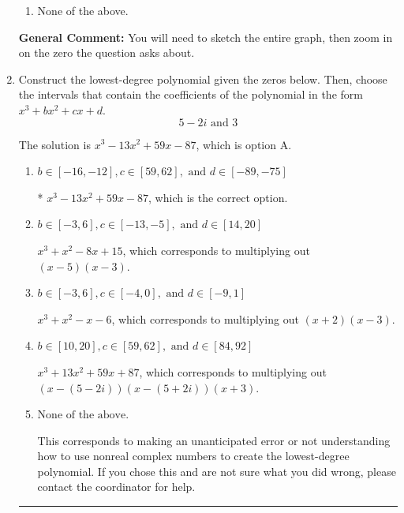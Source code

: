 \documentclass{extbook}[14pt]
\newcommand{\litem}[1]{\item #1

\rule{\textwidth}{0.4pt}}
\begin{document}
\begin{enumerate}
{\begin{enumerate}[label=\Alph*.]
\item None of the above.\end{enumerate}
\textbf{General Comment:} You will need to sketch the entire graph, then zoom in on the zero the question asks about.
}
\litem{
Construct the lowest-degree polynomial given the zeros below. Then, choose the intervals that contain the coefficients of the polynomial in the form $x^3+bx^2+cx+d$.
\[ 5 - 2 i \text{ and } 3 \]

The solution is \( x^{3} -13 x^{2} +59 x -87 \), which is option A.\begin{enumerate}[label=\Alph*.]
\item \( b \in [-16, -12], c \in [59, 62], \text{ and } d \in [-89, -75] \)

* $x^{3} -13 x^{2} +59 x -87$, which is the correct option.
\item \( b \in [-3, 6], c \in [-13, -5], \text{ and } d \in [14, 20] \)

$x^{3} + x^{2} -8 x + 15$, which corresponds to multiplying out $(x -5)(x -3)$.
\item \( b \in [-3, 6], c \in [-4, 0], \text{ and } d \in [-9, 1] \)

$x^{3} + x^{2} -x -6$, which corresponds to multiplying out $(x + 2)(x -3)$.
\item \( b \in [10, 20], c \in [59, 62], \text{ and } d \in [84, 92] \)

$x^{3} +13 x^{2} +59 x + 87$, which corresponds to multiplying out $(x-(5 - 2 i))(x-(5 + 2 i))(x + 3)$.
\item \( \text{None of the above.} \)

This corresponds to making an unanticipated error or not understanding how to use nonreal complex numbers to create the lowest-degree polynomial. If you chose this and are not sure what you did wrong, please contact the coordinator for help.
\end{enumerate}

}
\end{enumerate}
\end{document}
